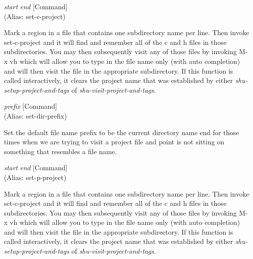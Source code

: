 \vspace{1em}
\noindent
{}
\usebox{\funcname}\emph{start} \emph{end}
 \hfill [Command]\\%
 (Alias: set-c-project)

\begin{doc-string}
Mark a region in a file that contains one subdirectory name per line.  Then
invoke set-c-project and it will find and remember all of the c and h files in
those subdirectories.  You may then subsequently visit any of those files by
invoking M-x vh which will allow you to type in the file name only (with auto
completion) and will then visit the file in the appropriate subdirectory.  If
this function is called interactively, it clears the project name that was
established by either \emph{shu-setup-project-and-tags} of \emph{shu-visit-project-and-tags}.
\end{doc-string}

\vspace{1em}
\noindent
{}
\usebox{\funcname}\emph{prefix}
 \hfill [Command]\\%
 (Alias: set-dir-prefix)

\begin{doc-string}
Set the default file name prefix to be the current directory name end for those
times when we are trying to visit a project file and point is not sitting on
something that resembles a file name.
\end{doc-string}

\vspace{1em}
\noindent
{}
\usebox{\funcname}\emph{start} \emph{end}
 \hfill [Command]\\%
 (Alias: set-p-project)

\begin{doc-string}
Mark a region in a file that contains one subdirectory name per line.  Then
invoke set-c-project and it will find and remember all of the c and h files in
those subdirectories.  You may then subsequently visit any of those files by
invoking M-x vh which will allow you to type in the file name only (with auto
completion) and will then visit the file in the appropriate subdirectory.  If
this function is called interactively, it clears the project name that was
established by either \emph{shu-setup-project-and-tags} of \emph{shu-visit-project-and-tags}.
\end{doc-string}

